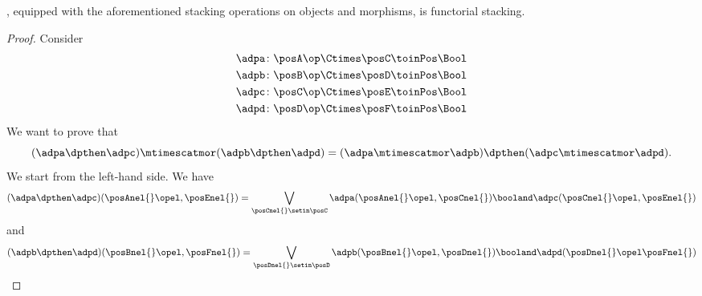 \begin{lemma}\label{lem:DPL-functorial-stacking}
    \DPL, equipped with the aforementioned stacking operations on objects and morphisms, is functorial stacking.
\end{lemma}

\begin{proof}
    Consider
    \begin{equation}
        \begin{aligned}
            \adpa\colon \posA\op\Ctimes \posC & \toinPos \Bool \\
            \adpb\colon \posB\op\Ctimes \posD & \toinPos \Bool \\
            \adpc\colon \posC\op\Ctimes \posE & \toinPos \Bool \\
            \adpd\colon \posD\op\Ctimes \posF & \toinPos \Bool
        \end{aligned}
    \end{equation}
    We want to prove that
    \begin{equation}
        (\adpa \dpthen \adpc)
        \mtimescatmor (\adpb \dpthen \adpd)=(\adpa \mtimescatmor \adpb) \dpthen (\adpc \mtimescatmor \adpd).
    \end{equation}
    We start from the left-hand side.
    We have
    \begin{equation}
        (\adpa \dpthen \adpc)(\posAnel{}\opel,\posEnel{})
        =\bigvee_{\posCnel{}\setin \posC}
        \adpa(\posAnel{}\opel, \posCnel{}) \booland \adpc(\posCnel{}\opel,\posEnel{})
    \end{equation}
    and
    \begin{equation}
        \begin{aligned}
            (\adpb \dpthen \adpd)(\posBnel{}\opel,\posFnel{})
            =\bigvee_{\posDnel{}\setin \posD}
            \adpb(\posBnel{}\opel, \posDnel{}) \booland \adpd(\posDnel{}\opel\posFnel{})

\end{aligned}
\end{equation}
\end{proof}
